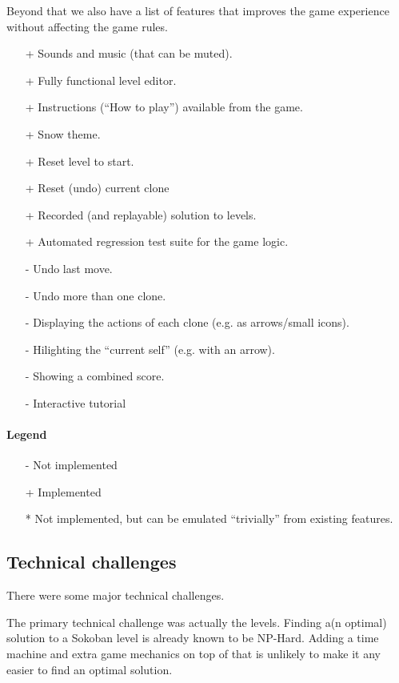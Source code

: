 Beyond that we also have a list of features that improves the game
experience without affecting the game rules.

\begin{itemize}
\item[+] Sounds and music (that can be muted).
\item[+] Fully functional level editor.
\item[+] Instructions (``How to play'') available from the game.
\item[+] Snow theme.
\item[+] Reset level to start.
\item[+] Reset (undo) current clone
\item[+] Recorded (and replayable) solution to levels.
\item[+] Automated regression test suite for the game logic.
\item[-] Undo last move.
\item[-] Undo more than one clone.
\item[-] Displaying the actions of each clone (e.g. as arrows/small icons).
\item[-] Hilighting the ``current self'' (e.g. with an arrow).
\item[-] Showing a combined score.
\item[-] Interactive tutorial
\end{itemize}

\paragraph{Legend}
\begin{itemize}
\item[-] Not implemented
\item[+] Implemented
\item[*] Not implemented, but can be emulated ``trivially'' from existing
 features.
\end{itemize}

\subsection{Technical challenges}
There were some major technical challenges.

The primary technical challenge was actually the levels.  Finding a(n
optimal) solution to a Sokoban level is already known to be NP-Hard.
Adding a time machine and extra game mechanics on top of that is
unlikely to make it any easier to find an optimal solution.

